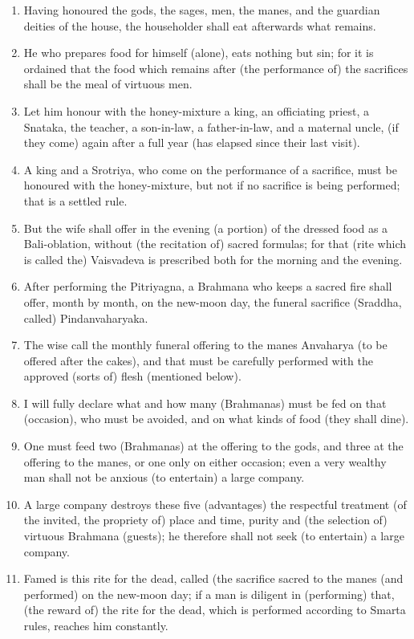 \begin{enumerate}
\item Having honoured the gods, the sages, men, the manes, and the guardian deities of the house, the householder shall eat afterwards what remains.
\item He who prepares food for himself (alone), eats nothing but sin; for it is ordained that the food which remains after (the performance of) the sacrifices shall be the meal of virtuous men.
\item Let him honour with the honey-mixture a king, an officiating priest, a Snataka, the teacher, a son-in-law, a father-in-law, and a maternal uncle, (if they come) again after a full year (has elapsed since their last visit).
\item A king and a Srotriya, who come on the performance of a sacrifice, must be honoured with the honey-mixture, but not if no sacrifice is being performed; that is a settled rule.
\item But the wife shall offer in the evening (a portion) of the dressed food as a Bali-oblation, without (the recitation of) sacred formulas; for that (rite which is called the) Vaisvadeva is prescribed both for the morning and the evening.
\item After performing the Pitriyagna, a Brahmana who keeps a sacred fire shall offer, month by month, on the new-moon day, the funeral sacrifice (Sraddha, called) Pindanvaharyaka.
\item The wise call the monthly funeral offering to the manes Anvaharya (to be offered after the cakes), and that must be carefully performed with the approved (sorts of) flesh (mentioned below).
\item I will fully declare what and how many (Brahmanas) must be fed on that (occasion), who must be avoided, and on what kinds of food (they shall dine).
\item One must feed two (Brahmanas) at the offering to the gods, and three at the offering to the manes, or one only on either occasion; even a very wealthy man shall not be anxious (to entertain) a large company.
\item A large company destroys these five (advantages) the respectful treatment (of the invited, the propriety of) place and time, purity and (the selection of) virtuous Brahmana (guests); he therefore shall not seek (to entertain) a large company.
\item Famed is this rite for the dead, called (the sacrifice sacred to the manes (and performed) on the new-moon day; if a man is diligent in (performing) that, (the reward of) the rite for the dead, which is performed according to Smarta rules, reaches him constantly.

\end{enumerate}
